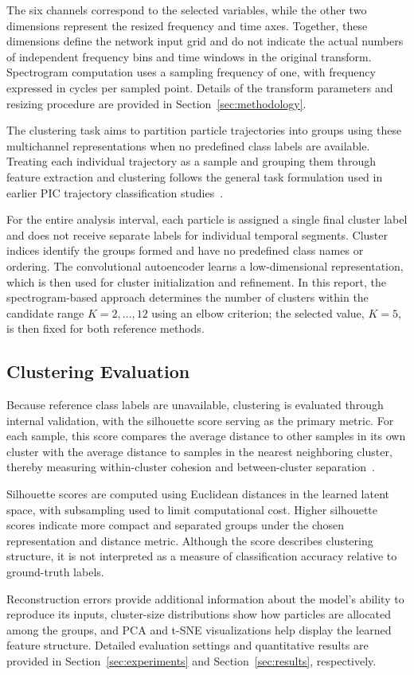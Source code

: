 The six channels correspond to the selected variables, while the other two dimensions represent the resized frequency and time axes. Together, these dimensions define the network input grid and do not indicate the actual numbers of independent frequency bins and time windows in the original transform. Spectrogram computation uses a sampling frequency of one, with frequency expressed in cycles per sampled point. Details of the transform parameters and resizing procedure are provided in Section~\ref{sec:methodology}.

The clustering task aims to partition particle trajectories into groups using these multichannel representations when no predefined class labels are available. Treating each individual trajectory as a sample and grouping them through feature extraction and clustering follows the general task formulation used in earlier PIC trajectory classification studies~\cite{markidis2020}.

For the entire analysis interval, each particle is assigned a single final cluster label and does not receive separate labels for individual temporal segments. Cluster indices identify the groups formed and have no predefined class names or ordering. The convolutional autoencoder learns a low-dimensional representation, which is then used for cluster initialization and refinement. In this report, the spectrogram-based approach determines the number of clusters within the candidate range \(K=2,\ldots,12\) using an elbow criterion; the selected value, \(K=5\), is then fixed for both reference methods.

\subsection{Clustering Evaluation}

Because reference class labels are unavailable, clustering is evaluated through internal validation, with the silhouette score serving as the primary metric. For each sample, this score compares the average distance to other samples in its own cluster with the average distance to samples in the nearest neighboring cluster, thereby measuring within-cluster cohesion and between-cluster separation~\cite{rousseeuw1987}.

Silhouette scores are computed using Euclidean distances in the learned latent space, with subsampling used to limit computational cost. Higher silhouette scores indicate more compact and separated groups under the chosen representation and distance metric. Although the score describes clustering structure, it is not interpreted as a measure of classification accuracy relative to ground-truth labels.

Reconstruction errors provide additional information about the model's ability to reproduce its inputs, cluster-size distributions show how particles are allocated among the groups, and PCA and t-SNE visualizations help display the learned feature structure. Detailed evaluation settings and quantitative results are provided in Section~\ref{sec:experiments} and Section~\ref{sec:results}, respectively.
